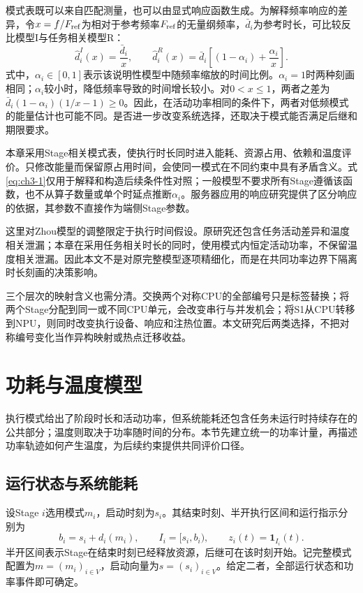 模式表既可以来自匹配测量，也可以由显式响应函数生成。为解释频率响应的差异，令\(x=f/F_{\rm ref}\)为相对于参考频率\(F_{\rm ref}\)的无量纲频率，\(\bar d_i\)为参考时长，可比较反比模型I与任务相关模型R：
\begin{equation}
\widehat d_i^I(x)=\frac{\bar d_i}{x},\qquad
\widehat d_i^R(x)=\bar d_i\left[(1-\alpha_i)+\frac{\alpha_i}{x}\right].
\label{eq:ch3-1}
\end{equation}
式中，\(\alpha_i\in[0,1]\)表示该说明性模型中随频率缩放的时间比例。\(\alpha_i=1\)时两种刻画相同；\(\alpha_i\)较小时，降低频率导致的时间增长较小。对\(0<x\le1\)，两者之差为\(\bar d_i(1-\alpha_i)(1/x-1)\ge0\)。因此，在活动功率相同的条件下，两者对低频模式的能量估计也可能不同。是否进一步改变系统选择，还取决于模式能否满足后继和期限要求。

本章采用Stage相关模式表，使执行时长同时进入能耗、资源占用、依赖和温度评价。只修改能量而保留原占用时间，会使同一模式在不同约束中具有矛盾含义。式\eqref{eq:ch3-1}仅用于解释和构造后续条件性对照；一般模型不要求所有Stage遵循该函数，也不从算子数量或单个时延点推断\(\alpha_i\)。服务器应用的响应研究\cite{source2}提供了区分响应的依据，其参数不直接作为端侧Stage参数。

这里对Zhou模型的调整限定于执行时间假设。原研究还包含任务活动差异和温度相关泄漏\cite{source1}；本章在采用任务相关时长的同时，使用模式内恒定活动功率，不保留温度相关泄漏。因此本文不是对原完整模型逐项精细化，而是在共同功率边界下隔离时长刻画的决策影响。

三个层次的映射含义也需分清。交换两个对称CPU的全部编号只是标签替换；将两个Stage分配到同一或不同CPU单元，会改变串行与并发机会；将S1从CPU转移到NPU，则同时改变执行设备、响应和注热位置。本文研究后两类选择，不把对称编号变化当作异构映射或热点迁移收益。

\section{功耗与温度模型}

执行模式给出了阶段时长和活动功率，但系统能耗还包含任务未运行时持续存在的公共部分；温度则取决于功率随时间的分布。本节先建立统一的功率计量，再描述功率轨迹如何产生温度，为后续约束提供共同评价口径。

\subsection{运行状态与系统能耗}

设Stage \(i\)选用模式\(m_i\)，启动时刻为\(s_i\)。其结束时刻、半开执行区间和运行指示分别为
\begin{equation}
b_i=s_i+d_i(m_i),\qquad I_i=[s_i,b_i),\qquad z_i(t)=\mathbf1_{I_i}(t).
\label{eq:ch3-2}
\end{equation}
半开区间表示Stage在结束时刻已经释放资源，后继可在该时刻开始。记完整模式配置为\(m=(m_i)_{i\in V}\)，启动向量为\(s=(s_i)_{i\in V}\)。给定二者，全部运行状态和功率事件即可确定。




